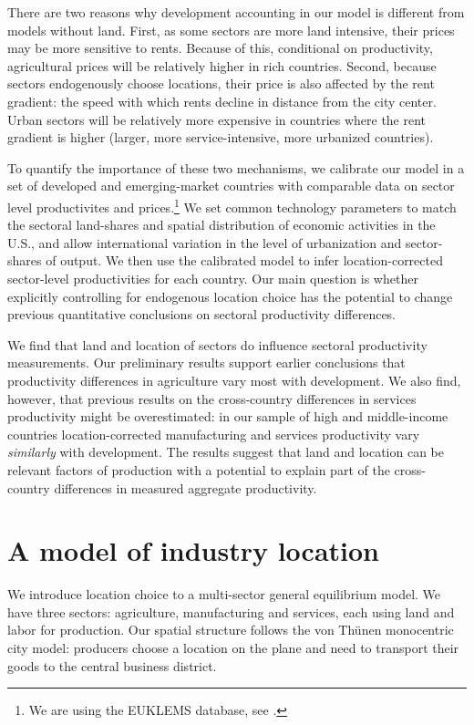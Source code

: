 \documentclass[12pt]{article}
\begin{document}
There are two reasons why development accounting in our model is different from models without land. First, as some sectors are more land intensive, their prices may be more sensitive to rents. Because of this, conditional on productivity, agricultural prices will be relatively higher in rich countries. Second, because sectors endogenously choose locations, their price is also affected by the rent gradient: the speed with which rents decline in distance from the city center. Urban sectors will be relatively more expensive in countries where the rent gradient is higher (larger, more service-intensive, more urbanized countries).

To quantify the importance of these two mechanisms, we calibrate our model in a set of developed and emerging-market countries with comparable data on sector level productivites and prices.\footnote{We are using the EUKLEMS database, see .} We set common technology parameters to match the sectoral land-shares and spatial distribution of economic activities in the U.S., and allow international variation in the level of urbanization and sector-shares of output. We then use the calibrated model to infer location-corrected sector-level productivities for each country. Our main question is whether explicitly controlling for endogenous location choice has the potential to change previous quantitative conclusions on sectoral productivity differences. %

We find that land and location of sectors do influence sectoral productivity measurements. Our preliminary results support earlier conclusions that productivity differences in agriculture vary most with development. We also find, however, that previous results on the cross-country differences in services productivity might be overestimated: in our sample of high and middle-income countries location-corrected manufacturing and services productivity vary \emph{similarly} with development. The results suggest that land and location can be relevant factors of production with a potential to explain part of the cross-country differences in measured aggregate productivity.

\section{A model of industry location}
We introduce location choice to a multi-sector general equilibrium model. We have three sectors: agriculture, manufacturing and services, each using land and labor for production. Our spatial structure follows the von Thünen monocentric city model: producers choose a location on the plane and need to transport their goods to the central business district. %
\end{document}
